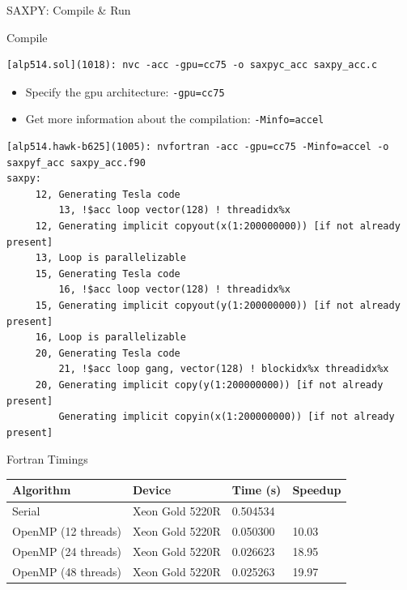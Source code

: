 \documentclass[10pt,t]{beamer}
\begin{document}
\begin{frame}{SAXPY: Compile \& Run}
  \vspace{-0.5cm}
  \begin{exampleblock}{Compile}
    \begin{lstlisting}[basicstyle=\fontsize{6}{8}\selectfont\ttfamily]
[alp514.sol](1018): nvc -acc -gpu=cc75 -o saxpyc_acc saxpy_acc.c
    \end{lstlisting}
    \begin{itemize}
      \item Specify the gpu architecture: \lstinline[basicstyle=\small\ttfamily]|-gpu=cc75| 
      \item Get more information about the compilation: \lstinline[basicstyle=\small\ttfamily]|-Minfo=accel|
    \end{itemize}
    \begin{lstlisting}[basicstyle=\fontsize{6}{8}\selectfont\ttfamily]
[alp514.hawk-b625](1005): nvfortran -acc -gpu=cc75 -Minfo=accel -o saxpyf_acc saxpy_acc.f90
saxpy:
     12, Generating Tesla code
         13, !$acc loop vector(128) ! threadidx%x
     12, Generating implicit copyout(x(1:200000000)) [if not already present]
     13, Loop is parallelizable
     15, Generating Tesla code
         16, !$acc loop vector(128) ! threadidx%x
     15, Generating implicit copyout(y(1:200000000)) [if not already present]
     16, Loop is parallelizable
     20, Generating Tesla code
         21, !$acc loop gang, vector(128) ! blockidx%x threadidx%x
     20, Generating implicit copy(y(1:200000000)) [if not already present]
         Generating implicit copyin(x(1:200000000)) [if not already present]
    \end{lstlisting}
  \end{exampleblock}
  \framebreak
  \begin{exampleblock}{Fortran Timings}
    {\scriptsize
    \begin{center}
      \begin{tabular}{|bbbb|}
        \hline
        \rowcolor{lublue}Algorithm & Device & Time (s) & Speedup \\
        \hline
         Serial & Xeon Gold 5220R & 0.504534 & \\
         \hline
         OpenMP (12 threads) & Xeon Gold 5220R & 0.050300 & 10.03 \\
         OpenMP (24 threads) & Xeon Gold 5220R & 0.026623 & 18.95 \\
         OpenMP (48 threads) & Xeon Gold 5220R & 0.025263 & 19.97 \\

\end{tabular}
\end{center}}
\end{exampleblock}
\end{frame}
\end{document}
